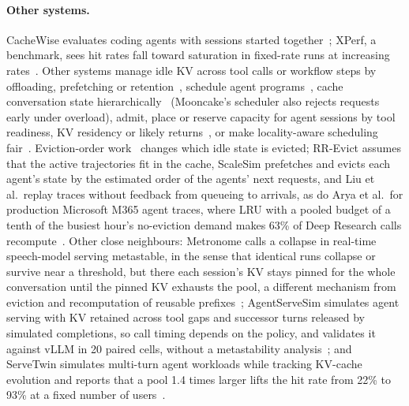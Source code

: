 \paragraph{Other systems.} CacheWise evaluates coding agents with sessions started together~\citep{tiwari2026cachewise}; XPerf, a benchmark, sees hit rates fall toward saturation in fixed-rate runs at increasing rates~\citep{wang2026xperf}. Other systems manage idle KV across tool calls or workflow steps by offloading, prefetching or retention~\citep{abhyankar2024infercept,pan2025kvflow,xia2026mori,bian2025tokencake,zhang2026cachescout,liu2026askthetool,biswas2026sutradhara}, schedule agent programs~\citep{luo2026agentix,lin2024parrot}, cache conversation state hierarchically~\citep{gao2024cachedattention,yu2025pensieve,qin2025mooncake} (Mooncake's scheduler also rejects requests early under overload), admit, place or reserve capacity for agent sessions by tool readiness, KV residency or likely returns~\citep{li2026tao,jiang2026coda,meng2026talaria}, or make locality-aware scheduling fair~\citep{cao2025dlpm}. Eviction-order work~\citep{pan2026rrevict,wu2026randomization,liu2026fancy,pan2026scalesim} changes which idle state is evicted; RR-Evict assumes that the active trajectories fit in the cache, ScaleSim prefetches and evicts each agent's state by the estimated order of the agents' next requests, and Liu et al.\ replay traces without feedback from queueing to arrivals, as do Arya et al.\ for production Microsoft M365 agent traces, where LRU with a pooled budget of a tenth of the busiest hour's no-eviction demand makes 63\% of Deep Research calls recompute~\citep{arya2026residency}. Other close neighbours: Metronome calls a collapse in real-time speech-model serving metastable, in the sense that identical runs collapse or survive near a threshold, but there each session's KV stays pinned for the whole conversation until the pinned KV exhausts the pool, a different mechanism from eviction and recomputation of reusable prefixes~\citep{meng2026metronome}; AgentServeSim simulates agent serving with KV retained across tool gaps and successor turns released by simulated completions, so call timing depends on the policy, and validates it against vLLM in 20 paired cells, without a metastability analysis~\citep{rajib2026agentservesim}; and ServeTwin simulates multi-turn agent workloads while tracking KV-cache evolution and reports that a pool 1.4 times larger lifts the hit rate from 22\% to 93\% at a fixed number of users~\citep{park2026servetwin}.
